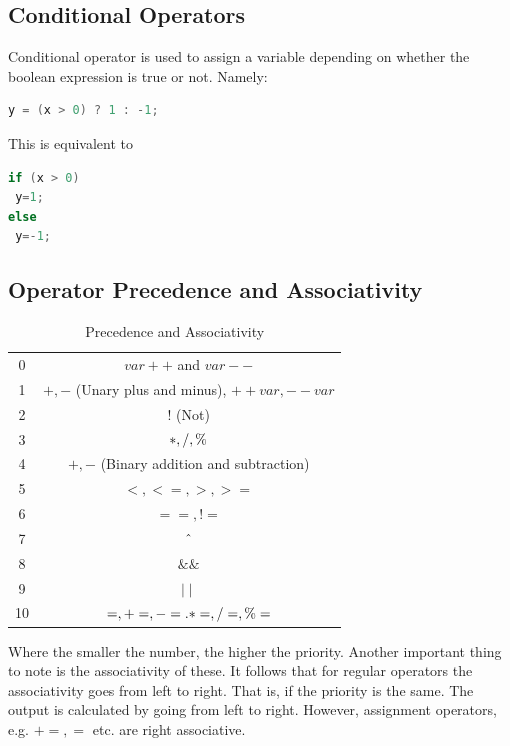 \documentclass[11pt,a4 paper]{book}
\theoremstyle{plain}
\theoremstyle{definition}
\theoremstyle{remark}
\begin{document}
\begin{flushleft}
\subsection{Conditional Operators}
Conditional operator is used to assign a variable depending on whether the boolean expression is true or not. Namely:
\begin{lstlisting}[language = Java]
y = (x > 0) ? 1 : -1;
\end{lstlisting}
This is equivalent to
\begin{lstlisting}[language = Java]
if (x > 0)
 y=1;
else
 y=-1;
\end{lstlisting}
\subsection{Operator Precedence and Associativity}
\begin{table}[H]
	\centering
	\caption{Precedence and Associativity}
	\label{tab:PaA}
	\begin{tabular}{cc}
	0 & $var++$ and $var--$ \\
	1 & $+,-$ (Unary plus and minus), $++var,--var$ \\
	2 & $!$ (Not) \\
	3 & $*,\string/, \%$ \\
	4 & $+,-$ (Binary addition and subtraction) \\
	5 & $<,<=,>,>=$ \\
	6 & $==, != $ \\
	7 & $\string^$ \\
	8 &  $\&\&$ \\
	9 & $ \mid  \mid $ \\
	10 & $=,+=,-=.*=,\string/=,\%=$
	\end{tabular}
\end{table}
Where the smaller the number, the higher the priority.
Another important thing to note is the associativity of these. It follows that for regular operators the associativity goes from left to right. That is, if the priority is the same. The output is calculated by going from left to right. However, assignment operators, e.g. $+=,=$ etc. are right associative.

\end{flushleft}
\end{document}
